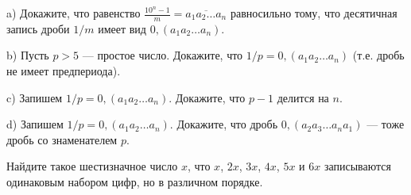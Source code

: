 \documentclass{article}
\begin{document}
\begin{enumerate_boxed}
        \item
        a) Докажите, что равенство $\frac{10^n-1}{m}=\overline{a_{1}a_2\dots a_n}$ равносильно тому, что десятичная запись дроби $1/m$ имеет вид $0,(a_{1}a_2\dots a_n)$.

        b) Пусть $p>5$ --- простое число.
        Докажите, что $1/p=0,(a_{1}a_2\dots a_n)$ (т.е. дробь не имеет предпериода).

        c) Запишем $1/p=0,(a_{1}a_2\dots a_n)$.
        Докажите, что $p-1$ делится на $n$.

        d) Запишем $1/p=0,(a_{1}a_2\dots a_n)$.
        Докажите, что дробь $0,(a_{2}a_3\dots a_{n}a_1)$ --- тоже дробь со знаменателем $p$.

        \item Найдите такое шестизначное число $x$, что $x$, $2x$, $3x$, $4x$, $5x$ и $6x$ записываются одинаковым набором цифр, но в различном порядке.

    \end{enumerate_boxed}
\end{document}
